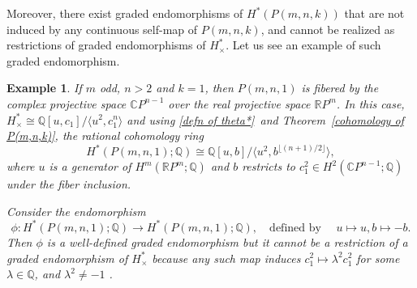 \documentclass{amsart}
\newtheorem{example}[theorem]{Example}
\newcommand{\thmref}[1]{Theorem~\ref{#1}}
\begin{document}
	Moreover, there exist graded endomorphisms of $H^*(P(m,n,k))$ that are not induced by any continuous self-map of $P(m,n,k)$, and cannot be realized as restrictions of graded endomorphisms of $H^*_{\times}$. Let us see an example of such graded %
endomorphism.
	
	
	\begin{example}
		If $m$ odd, $n>2$ and $k = 1$, then $P(m,n,1)$ is fibered by the complex projective space  $\mathbb{C} P^{n-1}$ over the real projective space $\mathbb{R} P^m$. In this case,  $H^*_\times\cong \mathbb Q[u,c_1]/\langle u^2, c_1^n\rangle$ and using \eqref{defn of theta*}\ and \thmref{cohomology of P(m,n,k)}, the rational cohomology ring $$H^*(P(m,n,1); \mathbb{Q}) \cong \mathbb{Q}[u, b] / \langle u^2, b^{\lfloor (n+1)/2 \rfloor} \rangle,$$ where %
$u$ is a generator of $H^m(\mathbb{R}P^m;\mathbb Q)$ and $b$ restricts to $c_1^2\in H^2(\mathbb CP^{n-1};\mathbb Q)$ under the fiber inclusion. 
		
		Consider the endomorphism
		\[
		\phi \colon H^*(P(m,n,1); \mathbb{Q}) \to H^*(P(m,n,1); \mathbb{Q}), \quad \text{defined by }\quad u \mapsto u,  b \mapsto -b.
		\]
		Then $\phi$ is a well-defined graded endomorphism but it cannot be a restriction of a graded endomorphism of $H^*_\times$ because any such map induces $c_1^2 \mapsto \lambda^2 c_1^2$ for some $\lambda \in \mathbb{Q}$, and $\lambda^2 \neq -1$%
.
	\end{example}
	
\end{document}
